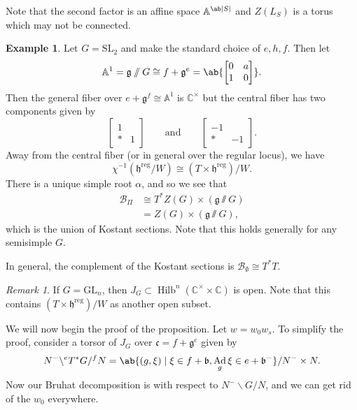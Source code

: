 \documentclass{amsart}
\theoremstyle{definition}
\newtheorem{exm}[thm]{Example}
\theoremstyle{remark}
\newtheorem{rmk}[thm]{Remark}
\theoremstyle{plain}
\theoremstyle{definition}
\theoremstyle{remark}
\newcommand{\A}{\mathbb{A}}
\newcommand{\C}{\mathbb{C}}
\newcommand{\g}{\mathfrak{g}}
\newcommand{\h}{\mathfrak{h}}
\renewcommand{\b}{\mathfrak{b}}
\newcommand{\mc}[1]{\mathcal{#1}}
\newcommand{\mf}[1]{\mathfrak{#1}}
\newcommand{\mr}[1]{\mathrm{#1}}
\newcommand{\on}[1]{\operatorname{#1}}
\newcommand{\1}{\mathbf{1}}
\newcommand{\2}{\mathbf{2}}
\newcommand{\3}{\mathbf{3}}
\newcommand{\GL}{\mr{GL}}
\newcommand{\SL}{\mr{SL}}
\DeclareMathOperator{\Ad}{Ad}
\begin{document}
Note that the second factor is an affine space \(\A^{\ab|S|}\) and \(Z(L_S)\) is a torus which may not be connected.

\begin{exm}
    Let \(G = \SL_2\) and make the standard choice of \(e,h,f\). Then let
    \[ \A^1 = \g \sslash G \cong f + \g^e = \ab\{ \begin{bmatrix}
        0 & a \\
        1 & 0
    \end{bmatrix} \}. \]
    Then the general fiber over \(e + \g^f \cong \A^1\) is \(\C^{\times}\) but the central fiber has two components given by
    \[ \begin{bmatrix}
        1 & \\
        * & 1 
    \end{bmatrix} \qquad \text{and} \qquad \begin{bmatrix}
        -1 & \\
        * & -1
    \end{bmatrix}. \]
    Away from the central fiber (or in general over the regular locus), we have
    \[ \chi^{-1}(\h^{\on{reg}}/W) \cong (T \times \h^{\on{reg}}) / W. \]
    There is a unique simple root \(\alpha\), and so we see that
    \begin{align*}
        \mc{B}_{\Pi} &\cong T^* Z(G) \times (\g \sslash G) \\
        &= Z(G) \times (\g \sslash G),
    \end{align*}
    which is the union of Kostant sections. Note that this holds generally for any semisimple \(G\).

    In general, the complement of the Kostant sections is \(\mc{B}_{\emptyset} \cong T^* T\).
\end{exm}

\begin{rmk}
    If \(G = \GL_n\), then \(J_G \subset \on{Hilb}^n(\C^{\times} \times \C)\) is open. Note that this contains \((T \times \h^{\on{reg}}) / W\) as another open subset.
\end{rmk}

We will now begin the proof of the proposition.
    Let \(w = w_0 w_s\). To simplify the proof, consider a torsor of \(J_G\) over \(\mf{c} = f + \g^e\) given by
    \[ N^- \backslash^e T^* G /^f N = \ab\{ (g, \xi) \mid \xi \in f + \b, \Ad_g \xi \in e + \b^- \} / N^- \times N. \]
    Now our Bruhat decomposition is with respect to \(N^- \backslash G / N\), and we can get rid of the \(w_0\) everywhere.
\end{document}
